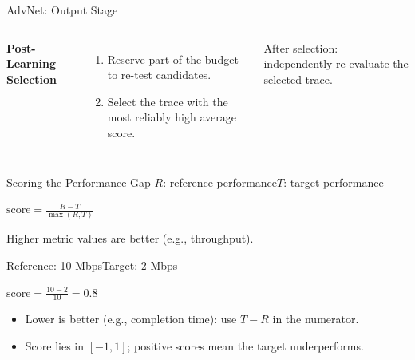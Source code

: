 \begin{frame}[t]{AdvNet: Output Stage}
\vspace{24pt}
\begin{columns}[c,onlytextwidth]
\column{250pt}
\compactfont
{\color{SemBlue}\textbf{Post-Learning Selection}}\par
\vspace{12pt}
\begin{enumerate}\setlength{\itemsep}{16pt}
\item Reserve part of the budget to re-test candidates.
\item Select the trace with the most reliably high average score.
\end{enumerate}
\vspace{20pt}
After selection: independently re-evaluate the selected trace.\par
\column{620pt}
\end{columns}
\end{frame}

\source{}
\begin{frame}[t]{Scoring the Performance Gap}
\bodyfont
$R$: reference performance\qquad $T$: target performance\par
\vspace{18pt}
{\fontsize{36}{44}\selectfont\centering
$\displaystyle\mathrm{score}=\frac{R-T}{\max(R,T)}$\par}
\vspace{16pt}
\begin{center}
\compactfont Higher metric values are better (e.g., throughput).
\end{center}
\pause
\vspace{14pt}
Reference: 10 Mbps\qquad Target: 2 Mbps\par
\vspace{12pt}
{\fontsize{36}{44}\selectfont\centering
$\displaystyle\mathrm{score}=\frac{10-2}{10}=0.8$\par}
\vspace{18pt}
\begin{itemize}\setlength{\itemsep}{10pt}
\item Lower is better (e.g., completion time): use $T-R$ in the numerator.
\item Score lies in $[-1,1]$; positive scores mean the target underperforms.
\end{itemize}
\end{frame}

